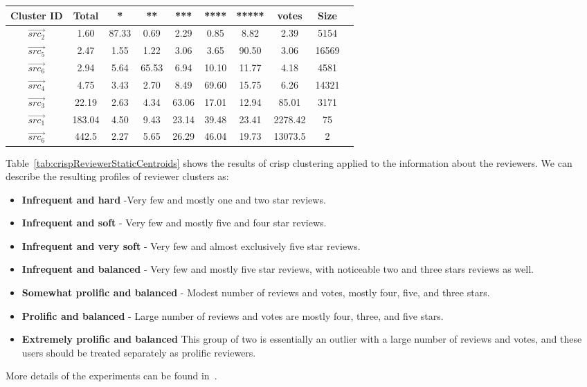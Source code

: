 \documentclass[oribibl]{llncs}
\begin{document}
\begin{table*}[h]
	\caption{Centroids from crisp clustering of reviewer data }
\centering
\small
{\setlength{\tabcolsep}{0.1cm}
\begin{tabular}{|c|c|c|c|c|c|c|c|c|c|}
\hline
Cluster ID&Total&*&**&***&****&*****&votes& Size\\
\hline
$\vec{src_2}$&1.60&87.33&0.69&2.29&0.85&8.82&2.39&5154\\
\hline
$\vec{src_5}$&2.47&1.55&1.22&3.06&3.65&90.50&3.06&16569\\
\hline
$\vec{src_6}$&2.94&5.64&65.53&6.94&10.10&11.77&4.18&4581\\
\hline
$\vec{src_4}$&4.75&3.43&2.70&8.49&69.60&15.75&6.26&14321\\
\hline
$\vec{src_3}$&22.19&2.63&4.34&63.06&17.01&12.94&85.01&3171\\
\hline
$\vec{src_1}$&183.04&4.50&9.43&23.14&39.48&23.41&2278.42&75\\
\hline
$\vec{src_6}$&442.5&2.27&5.65&26.29&46.04&19.73&13073.5&2\\
\hline
\end{tabular}}
\label{tab:crispReviewerStaticCentroids} 
\end{table*}


Table~\ref{tab:crispReviewerStaticCentroids} shows the results of crisp clustering applied to the information about the reviewers.
We can describe the resulting profiles of reviewer clusters as:

\begin{itemize}
\item [$\vec{src}_1$] {\bf Infrequent and hard} -Very few and mostly one and two star reviews. 
\item [$\vec{src}_2$]{\bf Infrequent and soft} - Very few and mostly five and four star reviews. 
\item [$\vec{src}_3$] {\bf Infrequent and very soft} - Very few and almost exclusively five star reviews.
\item [$\vec{src}_4$] {\bf Infrequent and balanced} - Very few and mostly five star reviews, with noticeable two and three stars reviews as well.
\item [$\vec{src}_5$] {\bf Somewhat prolific and balanced} - Modest number of reviews and votes, mostly four, five, and three stars.
\item [$\vec{src}_6$] {\bf Prolific and balanced} - Large number of reviews and votes are mostly four, three, and five stars. 
\item [$\vec{src}_7$] {\bf Extremely prolific and balanced} This group of two is essentially an outlier with a large number of reviews and votes, and these users should be treated separately as prolific reviewers.  
\end{itemize}
More details of the experiments can be found in~\cite{LingrasTriff2015}.
\end{document}
